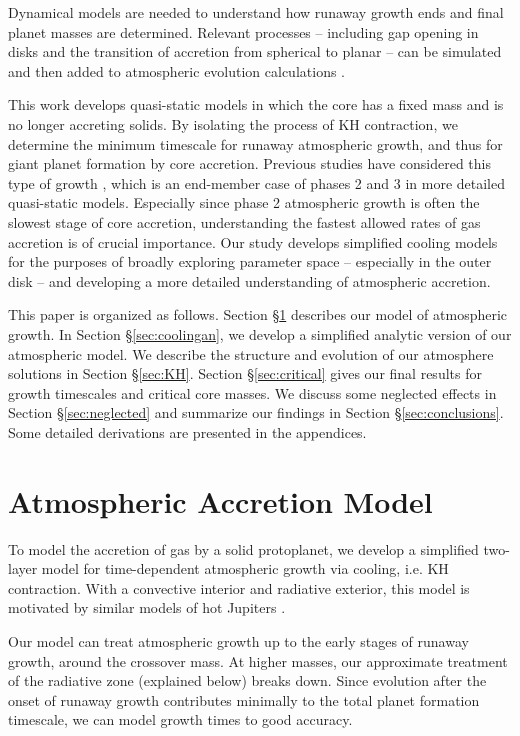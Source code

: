 \documentclass[apj, numberedappendix]{emulateapj}
\begin{document}
Dynamical models are needed to understand how runaway growth ends and final planet masses are determined.  Relevant processes -- including gap opening in disks and the transition of accretion from spherical to planar -- can be simulated and then added to atmospheric evolution calculations \citep{LisHub09}.

This work develops quasi-static models in which the core has a fixed mass and is no longer accreting solids.  By isolating the process of KH contraction, we determine the minimum timescale for runaway atmospheric growth, and thus for giant planet formation by core accretion.  Previous studies have considered this type of growth \citep[hereafter I00; PN05, respectively]{ikoma00, pn05}, which is an end-member case of phases 2 and 3 in more detailed quasi-static models.  Especially since phase 2 atmospheric growth is often the slowest stage of core accretion, understanding the fastest allowed rates of gas accretion is of crucial importance.  Our study develops simplified cooling models for the purposes of broadly exploring parameter space -- especially in the outer disk -- and developing a more detailed understanding of atmospheric accretion.

This paper is organized as follows. Section \S\ref{sec:model} describes our model of atmospheric growth.  In Section \S\ref{sec:coolingan}, we develop a simplified analytic version of our atmospheric model.  We describe the structure and evolution of our atmosphere solutions in Section \S\ref{sec:KH}.   Section \S\ref{sec:critical} gives our final results for growth timescales and critical core masses.  We discuss some neglected effects in Section \S\ref{sec:neglected} and summarize our findings in Section \S\ref{sec:conclusions}.  Some detailed derivations are presented in the appendices.


\section{Atmospheric Accretion Model} \label{sec:model}

To model the accretion of gas by a solid protoplanet, we develop a simplified two-layer model for time-dependent atmospheric growth via cooling, i.e. KH contraction.  With a convective interior and radiative exterior, this model is motivated by similar models of hot Jupiters \citep{ab06, ym10}. 

Our model can  treat atmospheric growth up to the early stages of runaway growth, around the crossover mass.  At higher masses, our approximate treatment of the radiative zone (explained below) breaks down.   Since evolution after the onset of runaway growth contributes minimally to the total planet formation timescale, we can model growth times to good accuracy. 
\end{document}
